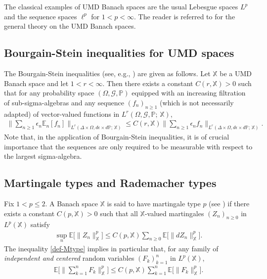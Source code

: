 \documentclass[12pt]{amsart}
\theoremstyle{definition}
\theoremstyle{remark}
\newcommand{\E}{\mathbb{E}}
\newcommand{\PP}{\mathbb{P}}
\newcommand{\fX}{\mathbb{X}}
\numberwithin{equation}{section}
\begin{document}
The classical examples of UMD Banach spaces are the usual Lebesgue spaces $L^p$ and the sequence spaces $\ell^p$ for $1< p<\infty$.  The reader is referred to \cite[Chapters 5-6 and Chapter 10]{Pisier-book} for the general theory on the UMD Banach spaces. 




 
 \subsection{Bourgain-Stein inequalities for UMD spaces}
 
  The Bourgain-Stein inequalities (see, e.g.,  \cite[Theorem 5.60, p. 196]{Pisier-book}) are given as follows.  Let $\fX$ be a UMD Banach space and let $1<r<\infty$. Then there exists a constant $C(r, \fX)>0$ such that  for  any probability space $(\Omega,  \mathscr{G}, \PP)$ equipped with an increasing filtration  of sub-sigma-algebras  and  any sequence $(f_n)_{n\ge 1}$  (which is not necessarily adapted) of  vector-valued functions in $L^r(\Omega, \mathscr{G}, \PP; \, \fX)$, 
 \begin{align}\label{BS-ineq}
\Big\| \sum_{n\ge 1} \epsilon_n \E_n[f_n] \Big\|_{L^r(\Delta\times \Omega, d\epsilon\times d\PP; \, \fX)} \le C(r, \fX)  \Big\| \sum_{n\ge 1} \epsilon_n f_n \Big\|_{L^r(\Delta\times \Omega, d\epsilon\times d\PP; \, \fX)}. 
 \end{align}
Note that,   in the application of Bourgain-Stein inequalities, it is of crucial importance that the sequences are only required to be  measurable with respect to the largest sigma-algebra.  


 
 \subsection{Martingale types and Rademacher types}
Fix $1< p\le 2$. A Banach space $\fX$ is said to have martingale type $p$  (see \cite[Definition 10.41, p. 409]{Pisier-book}) if there exists a constant $C(p, \fX)>0$ such that all $\fX$-valued martingales $(Z_n)_{n\ge 0}$ in $L^p(\fX)$ satisfy
\begin{align}\label{def-Mtype}
\sup_n    \E \big[ \| Z_n\|_\fX^p\big] \le  C(p, \fX) \sum_{n \ge 0}   \E\big[ \|dZ_n\|_\fX^p\big].
\end{align}
The inequality \eqref{def-Mtype} implies in particular that,  for any family of {\it independent and  centered}  random variables $(F_k)_{k=1}^n$  in $L^p(\fX)$, 
\begin{align}\label{def-ind-Mtype}
\E\Big[ \Big\|\sum_{k=1}^n F_k \Big\|_{\fX}^p\Big] \le C(p, \fX)   \sum_{k =1}^n \E\big[\|F_k \|_{\fX}^p\big].  
\end{align} 
\end{document}
